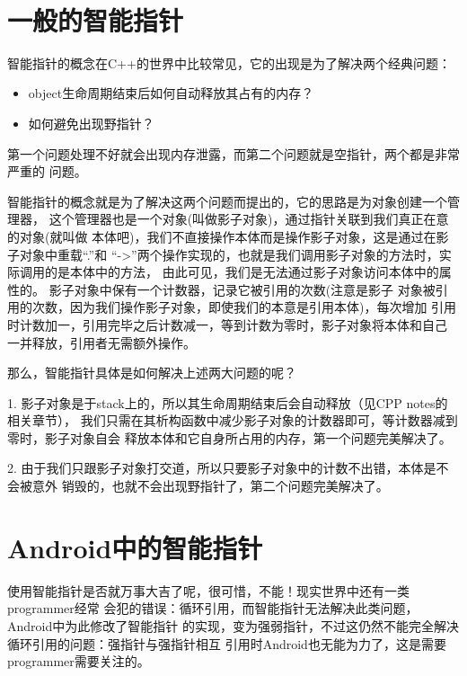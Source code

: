 \documentclass[a4paper,11pt]{article}
\begin{document}
\tt %
\pagestyle{header}
\sybmaketitle
\tableofcontents
\newpage

\pagestyle{main}
\setcounter{page}{1}

\section[一般的智能指针]{一般的智能指针}
智能指针的概念在C++的世界中比较常见，它的出现是为了解决两个经典问题：
\begin{itemize}
\item object生命周期结束后如何自动释放其占有的内存？
\item 如何避免出现野指针？
\end{itemize}
第一个问题处理不好就会出现内存泄露，而第二个问题就是空指针，两个都是非常严重的
问题。

智能指针的概念就是为了解决这两个问题而提出的，它的思路是为对象创建一个管理器，
这个管理器也是一个对象(叫做影子对象)，通过指针关联到我们真正在意的对象(就叫做
本体吧)，我们不直接操作本体而是操作影子对象，这是通过在影子对象中重载“.”和
“->”两个操作实现的，也就是我们调用影子对象的方法时，实际调用的是本体中的方法，
由此可见，我们是无法通过影子对象访问本体中的属性的。
影子对象中保有一个计数器，记录它被引用的次数(注意是影子
对象被引用的次数，因为我们操作影子对象，即使我们的本意是引用本体)，每次增加
引用时计数加一，引用完毕之后计数减一，等到计数为零时，影子对象将本体和自己
一并释放，引用者无需额外操作。

那么，智能指针具体是如何解决上述两大问题的呢？

1. 影子对象是于stack上的，所以其生命周期结束后会自动释放（见CPP notes的相关章节），
我们只需在其析构函数中减少影子对象的计数器即可，等计数器减到零时，影子对象自会
释放本体和它自身所占用的内存，第一个问题完美解决了。

2. 由于我们只跟影子对象打交道，所以只要影子对象中的计数不出错，本体是不会被意外
销毁的，也就不会出现野指针了，第二个问题完美解决了。

\section[Android中的智能指针]{Android中的智能指针}
使用智能指针是否就万事大吉了呢，很可惜，不能！现实世界中还有一类programmer经常
会犯的错误：循环引用，而智能指针无法解决此类问题，Android中为此修改了智能指针
的实现，变为强弱指针，不过这仍然不能完全解决循环引用的问题：强指针与强指针相互
引用时Android也无能为力了，这是需要programmer需要关注的。
\end{document}
